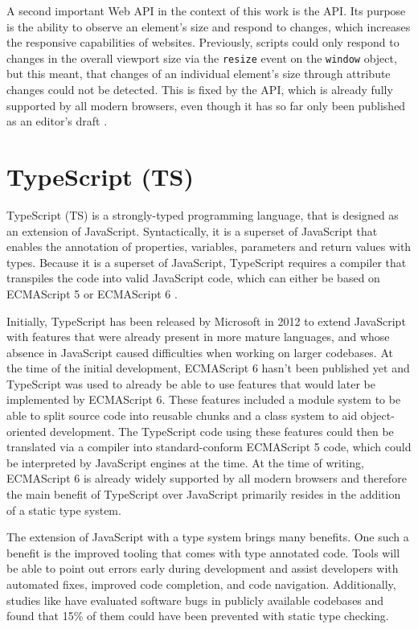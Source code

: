 A second important Web API in the context of this work is the  API. 
Its purpose is the ability to observe an element's size and respond to changes, which increases the responsive capabilities of websites. 
Previously, scripts could only respond to changes in the overall viewport size via the \lstinline{resize} event on the \lstinline{window} object, but this meant, that changes of an individual element's size through attribute changes could not be detected. 
This is fixed by the  API, which is already fully supported by all modern browsers, even though it has so far only been published as an editor's draft \parencite{ResizeObserver}.

\section{TypeScript (TS)}
\label{sec:TS}

TypeScript (TS) is a strongly-typed programming language, that is designed as an extension of JavaScript. 
Syntactically, it is a superset of JavaScript that enables the annotation of properties, variables, parameters and return values with types. 
Because it is a superset of JavaScript, TypeScript requires a compiler that transpiles the code into valid JavaScript code, which can either be based on ECMAScript 5 \parencite{ECMAScript5} or ECMAScript 6 \parencite{ECMAScript6}.

Initially, TypeScript has been released by Microsoft in 2012 \parencite{TSFirstRelease} to extend JavaScript with features that were already present in more mature languages, and whose absence in JavaScript caused difficulties when working on larger codebases. 
At the time of the initial development, ECMAScript 6 hasn't been published yet and TypeScript was used to already be able to use features that would later be implemented by ECMAScript 6.
These features included a module system to be able to split source code into reusable chunks and a class system to aid object-oriented development. 
The TypeScript code using these features could then be translated via a compiler into standard-conform ECMAScript 5 code, which could be interpreted by JavaScript engines at the time. 
At the time of writing, ECMAScript 6 is already widely supported by all modern browsers and therefore the main benefit of TypeScript over JavaScript primarily resides in the addition of a static type system.

The extension of JavaScript with a type system brings many benefits. 
One such a benefit is the improved tooling that comes with type annotated code. 
Tools will be able to point out errors early during development and assist developers with automated fixes, improved code completion, and code navigation. 
Additionally, studies like \cite{ToTypeOrNotToType} have evaluated software bugs in publicly available codebases and found that 15\% of them could have been prevented with static type checking.

